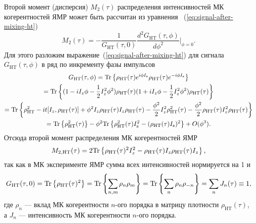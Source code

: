 Второй момент (дисперсия) $M_2(\tau)$ распределения интенсивностей МК когерентностей ЯМР может быть рассчитан из уравнения ~(\ref{eq:signal-after-mixing-ht})
\begin{equation}\label{eq:m2-derivative}
  M_2(\tau)
  = -\frac{1}{G_\mathrm{HT}(\tau, 0)}
    \frac{d^2 G_\mathrm{HT}(\tau, \phi)}{d\phi^2}\bigg|_{\phi=0}.
\end{equation}
%
Для этого разложим выражение~(\ref{eq:signal-after-mixing-ht})
для сигнала~$G_\mathrm{HT}(\tau,\phi)$ в ряд по инкременту фазы импульсов
%
\begin{multline}
  G_\mathrm{HT}(\tau,\phi)
  = \mathrm{Tr} \left\{ 
    \rho_\mathrm{HT}(\tau) e^{i \phi I_\mathrm{z} }
    \rho_\mathrm{HT}(\tau) e^{-i\phi I_\mathrm{z} }
   \right\} \\
  =  \mathrm{Tr} \left\{ 
    (1 - iI_z\phi - \frac{1}{2} I_z^2 \phi^2)
    \rho_\mathrm{HT}(\tau)
    (1 + iI_z\phi - \frac{1}{2} I_z^2 \phi^2)
    \rho_\mathrm{HT}(\tau)
   \right\} \\
  = \mathrm{Tr} \left\{ 
    \rho_\mathrm{HT}^2
    - it [I_z,\rho_\mathrm{HT}(\tau)]
    + \phi^2 I_z \rho_\mathrm{HT}(\tau) I_z \rho_\mathrm{HT}(\tau)
    - \frac{\phi^2}{2} I_z^2 \rho_\mathrm{HT}^2(\tau)
    - \frac{\phi^2}{2} \rho_\mathrm{HT}(\tau) I_z^2 \rho_\mathrm{HT}(\tau)
   \right\} \\
  = \mathrm{Tr} \left\{  \rho_\mathrm{HT}^2(\tau)  \right\}
  - \phi^2 \mathrm{Tr} \left\{ 
    \rho_\mathrm{HT}^2(\tau) I^2_\mathrm{z}
    - (\rho_\mathrm{HT}(\tau) I_\mathrm{z})^2
   \right\}
  + O(\phi^3).
\end{multline}
%
Отсюда второй момент распределения МК когерентностей ЯМР
%
\begin{equation}\label{eq:m2-trace}
  M_{2,\mathrm{HT}}(\tau) = 2 \mathrm{Tr} \left\{ 
    \rho_\mathrm{HT}(\tau)^2 I_z^2
    - \rho_\mathrm{HT}(\tau) I_z \rho_\mathrm{HT}(\tau) I_z
   \right\},
\end{equation}
%
так как в МК эксперименте ЯМР сумма всех интенсивностей нормируется на 1
и
\begin{equation}\label{eq:mq-coherences-sum}
  G_\mathrm{HT}(\tau, 0)
  = \mathrm{Tr} \left\{ \rho_\mathrm{HT}(\tau)^2 \right\}
  = \mathrm{Tr} \left\{ \sum\limits_{n,m} \rho_n \rho_m \right\}
  = \mathrm{Tr} \left\{ \sum\limits_{n} \rho_n \rho_{-n} \right\}
  = \sum_n J_n (\tau) \equiv 1,
\end{equation}
где $\rho_n$ ---  вклад МК когерентности $n$-ого порядка в матрицу плотности $\rho_\mathrm{HT}(\tau)$,
а $J_n$ --- интенсивность МК когерентности $n$-ого порядка.
